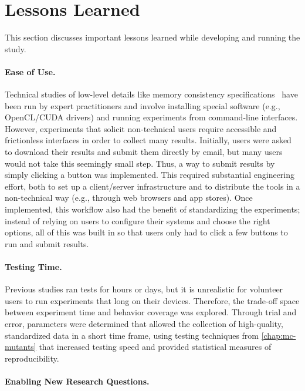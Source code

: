 \section{Lessons Learned \label{sec:gpuharbor-lessons-learned}}

This section discusses important lessons learned while developing and running the study.

\paragraph{Ease of Use.}

Technical studies of low-level details like memory consistency specifications~\cite{alglave2011litmus,sorensen2016exposing,kirkham2020foundations} have been run by expert practitioners and involve installing special software (e.g., OpenCL/CUDA drivers) and running experiments from command-line interfaces. However, experiments that solicit non-technical users require accessible and frictionless interfaces in order to collect many results. Initially, users were asked to download their results and submit them directly by email, but many users would not take this seemingly small step. Thus, a way to submit results by simply clicking a button was implemented. This required substantial engineering effort, both to set up a client/server infrastructure and to distribute the tools in a non-technical way (e.g., through web browsers and app stores). Once implemented, this workflow also had the benefit of standardizing the experiments; instead of relying on users to configure their systems and choose the right options, all of this was built in so that users only had to click a few buttons to run and submit results.

\paragraph{Testing Time.}

Previous studies ran tests for hours or days, but it is unrealistic for volunteer users to run experiments that long on their devices. Therefore, the trade-off space between experiment time and behavior coverage was explored. Through trial and error, parameters were determined that allowed the collection of high-quality, standardized data in a short time frame, using testing techniques from \mychap\ref{chap:mc-mutants} that increased testing speed and provided statistical measures of reproducibility.

\paragraph{Enabling New Research Questions.}

